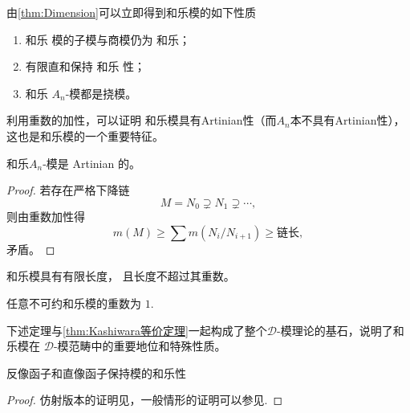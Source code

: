 \documentclass[12pt,a4paper]{ctexrep}   %
\begin{document}
由\ref{thm:Dimension}可以立即得到和乐模的如下性质
\begin{proposition}
    \begin{enumerate}
        \item
              和乐 模的子模与商模仍为 和乐；
        \item
              有限直和保持 和乐 性；
        \item
              和乐 $A_n$-模都是挠模。
    \end{enumerate}
\end{proposition}



利用重数的加性，可以证明 和乐模具有Artinian性（而$A_n$本不具有Artinian性），这也是和乐模的一个重要特征。
\begin{theorem}
    和乐$A_n$-模是 Artinian 的。
\end{theorem}

\begin{proof}
    若存在严格下降链
    \[
        M=N_0\supsetneq N_1\supsetneq\cdots,
    \]
    则由重数加性得
    \[
        m(M)\ge\sum m(N_i/N_{i+1})\ge\text{链长},
    \]
    矛盾。
\end{proof}

\begin{corollary}
    和乐模具有有限长度，
    且长度不超过其重数。
\end{corollary}

\begin{corollary}
    任意不可约和乐模的重数为 $1$.
\end{corollary}

下述定理与\ref{thm:Kashiwara等价定理}一起构成了整个$\mathcal{D}$-模理论的基石，说明了和乐模在 $\mathcal{D}$-模范畴中的重要地位和特殊性质。
\begin{theorem}[Kashiwara构造性定理]
    反像函子和直像函子保持模的和乐性
    \begin{proof}
        仿射版本的证明见\cite{coutinho1995primer}，一般情形的证明可以参见\cite{hotta2007d}.
    \end{proof}
\end{theorem}





\newpage
\end{document}
